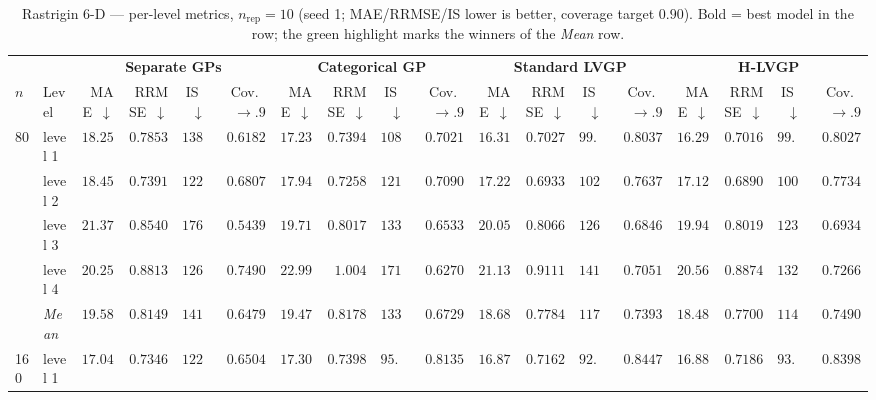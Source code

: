 \begin{table}[htbp]
\centering
\scriptsize
\setlength{\tabcolsep}{2.5pt}
\setlength{\fboxsep}{1pt}
\caption{Rastrigin 6-D --- per-level metrics, $n_{\mathrm{rep}}=10$ (seed 1; MAE/RRMSE/IS lower is better, coverage target $0.90$). Bold = best model in the row; the green highlight marks the winners of the \emph{Mean} row.}
\label{tab:rastrigin_6d_nrep10}
\begin{tabular}{llrrrrrrrrrrrrrrrr}
\toprule
 & & \multicolumn{4}{c}{\textbf{Separate GPs}} & \multicolumn{4}{c}{\textbf{Categorical GP}} & \multicolumn{4}{c}{\textbf{Standard LVGP}} & \multicolumn{4}{c}{\textbf{H-LVGP}} \\
\cmidrule(lr){3-6} \cmidrule(lr){7-10} \cmidrule(lr){11-14} \cmidrule(lr){15-18}
$n$ & Level & MAE~$\downarrow$ & RRMSE~$\downarrow$ & IS~$\downarrow$ & Cov.~$\to.9$ & MAE~$\downarrow$ & RRMSE~$\downarrow$ & IS~$\downarrow$ & Cov.~$\to.9$ & MAE~$\downarrow$ & RRMSE~$\downarrow$ & IS~$\downarrow$ & Cov.~$\to.9$ & MAE~$\downarrow$ & RRMSE~$\downarrow$ & IS~$\downarrow$ & Cov.~$\to.9$ \\
\midrule
\multirow{5}{*}{80} & level 1 & $18.25$ & $0.7853$ & $138.1$ & $0.6182$ & $17.23$ & $0.7394$ & $108.3$ & $0.7021$ & $16.31$ & $0.7027$ & $99.87$ & {\boldmath$0.8037$} & {\boldmath$16.29$} & {\boldmath$0.7016$} & {\boldmath$99.46$} & $0.8027$ \\
 & level 2 & $18.45$ & $0.7391$ & $122.9$ & $0.6807$ & $17.94$ & $0.7258$ & $121.6$ & $0.7090$ & $17.22$ & $0.6933$ & $102.3$ & $0.7637$ & {\boldmath$17.12$} & {\boldmath$0.6890$} & {\boldmath$100.4$} & {\boldmath$0.7734$} \\
 & level 3 & $21.37$ & $0.8540$ & $176.9$ & $0.5439$ & {\boldmath$19.71$} & {\boldmath$0.8017$} & $133.3$ & $0.6533$ & $20.05$ & $0.8066$ & $126.2$ & $0.6846$ & $19.94$ & $0.8019$ & {\boldmath$123.7$} & {\boldmath$0.6934$} \\
 & level 4 & {\boldmath$20.25$} & {\boldmath$0.8813$} & {\boldmath$126.5$} & {\boldmath$0.7490$} & $22.99$ & $1.004$ & $171.8$ & $0.6270$ & $21.13$ & $0.9111$ & $141.5$ & $0.7051$ & $20.56$ & $0.8874$ & $132.9$ & $0.7266$ \\
 & \textit{Mean} & $19.58$ & $0.8149$ & $141.1$ & $0.6479$ & $19.47$ & $0.8178$ & $133.7$ & $0.6729$ & $18.68$ & $0.7784$ & $117.5$ & $0.7393$ & \colorbox{green!20}{\boldmath$18.48$} & \colorbox{green!20}{\boldmath$0.7700$} & \colorbox{green!20}{\boldmath$114.1$} & \colorbox{green!20}{\boldmath$0.7490$} \\
\midrule
\multirow{5}{*}{160} & level 1 & $17.04$ & $0.7346$ & $122.5$ & $0.6504$ & $17.30$ & $0.7398$ & $95.58$ & $0.8135$ & {\boldmath$16.87$} & {\boldmath$0.7162$} & {\boldmath$92.62$} & {\boldmath$0.8447$} & $16.88$ & $0.7186$ & $93.23$ & $0.8398$ \\

\end{tabular}
\end{table}
